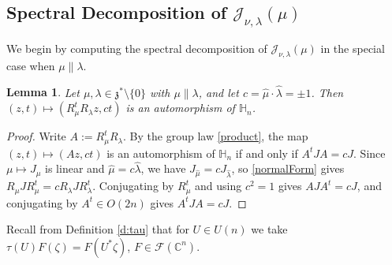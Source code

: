 \documentclass[11pt]{amsart}
\theoremstyle{plain}
\newtheorem{lemma}[theorem]{Lemma}
\theoremstyle{definition}
\theoremstyle{remark}
\numberwithin{equation}{section}
\def\fz{\mathfrak{z}}
\def\cJ{\mathcal{J}}
\def\cF{\mathcal{F}}
\def\mz{\setminus\{0\}}
\def\C{{\mathbb C}}%
\def \heis {\mathbb{H}}
\numberwithin{equation}{section}
\begin{document}
\subsection{Spectral Decomposition of $\cJ_{\nu, \lambda}(\mu)$}
We begin by computing the spectral decomposition of $\cJ_{\nu, \lambda}(\mu)$ in the special case when $\mu\parallel \lambda$. 
\begin{lemma}\label{l:homoH}
    Let $\mu, \lambda\in \fz^*\mz$ with $\mu\parallel \lambda$, and let $c=\hat{\mu}\cdot\hat{\lambda}=\pm 1$. Then $(z, t)\mapsto (R_\mu^tR_\lambda z, ct)$ is an automorphism of $\heis_n$.
\end{lemma}
\begin{proof}
    Write $A:=R_\mu^tR_\lambda$. By the group law \eqref{product}, the map $(z, t)\mapsto (Az, ct)$ is an automorphism of $\heis_n$ if and only if $A^tJA=cJ$. Since $\mu\mapsto J_\mu$ is linear and $\hat{\mu}=c\hat{\lambda}$, we have $J_{\hat\mu}=cJ_{\hat\lambda}$, so \eqref{normalForm} gives $R_\mu J R_\mu^t=cR_\lambda J R_\lambda^t$. Conjugating by $R_\mu^t$ and using $c^2=1$ gives $AJA^t=cJ$, and conjugating by $A^t\in O(2n)$ gives $A^tJA=cJ$.
\end{proof}
Recall from Definition \ref{d:tau} that for $U\in U(n)$ we take $\tau(U)F(\zeta)=F(U^*\zeta)$, $F\in \cF(\C^n)$.
\end{document}
